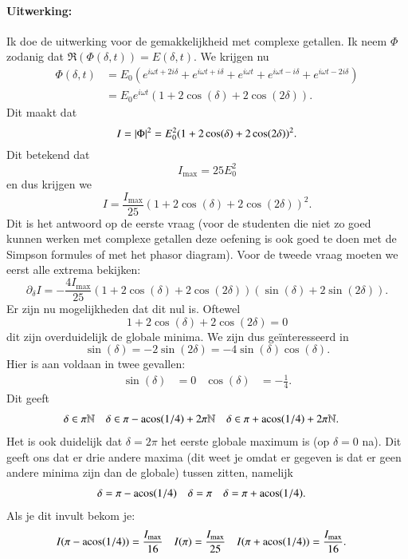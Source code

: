 \documentclass[11pt]{article}
\begin{document}
\paragraph{Uitwerking: }Ik doe de uitwerking voor de gemakkelijkheid met complexe getallen. Ik neem $\Phi$ zodanig dat $\Re(\Phi(\delta,t))=E(\delta,t)$. We krijgen nu
\begin{align}
	\Phi(\delta,t)&=E_0(e^{i\omega t+2i\delta}+e^{i\omega t+i\delta}+e^{i\omega t}+e^{i\omega t-i\delta}+e^{i\omega t-2i\delta})\\
	&=E_0 e^{i\omega t}(1+2\cos(\delta)+2\cos(2\delta)).
\end{align}
Dit maakt dat
\begin{equation}
	I=\abs{\Phi}^2=E_0^2(1+2\cos(\delta)+2\cos(2\delta))^2.
\end{equation}
Dit betekend dat
\begin{equation}
	I_{\text{max}}=25 E_0^2
\end{equation}
en dus krijgen we
\begin{equation}
	I=\frac{I_{\text{max}}}{25}(1+2\cos(\delta)+2\cos(2\delta))^2.
\end{equation}
Dit is het antwoord op de eerste vraag (voor de studenten die niet zo goed kunnen werken met complexe getallen deze oefening is ook goed te doen met de Simpson formules of met het phasor diagram). Voor de tweede vraag moeten we eerst alle extrema bekijken:
\begin{equation}
	\partial_\delta I = - \frac{4I_\text{max}}{25} (1+2\cos(\delta)+2\cos(2\delta))(\sin(\delta)+2\sin(2\delta)).
\end{equation}
Er zijn nu mogelijkheden dat dit nul is. Oftewel
\begin{equation}
	1+2\cos(\delta)+2\cos(2\delta)=0
\end{equation}
dit zijn overduidelijk de globale minima. We zijn dus geïnteresseerd in
\begin{equation}
	\sin(\delta)=-2\sin(2\delta)=-4\sin(\delta)\cos(\delta).
\end{equation}
Hier is aan voldaan in twee gevallen:
\begin{align}
	\sin(\delta)&=0&\cos(\delta)&=-\frac{1}{4}.
\end{align}
Dit geeft
\begin{align}
	\delta&\in \pi\mathbb{N}&\delta&\in\pi-\acos(1/4)+2\pi \mathbb{N}&\delta&\in\pi+\acos(1/4)+2\pi \mathbb{N}.
\end{align}
Het is ook duidelijk dat $\delta=2\pi$ het eerste globale maximum is (op $\delta=0$ na). Dit geeft ons dat er drie andere maxima (dit weet je omdat er gegeven is dat er geen andere minima zijn dan de globale) tussen zitten, namelijk
\begin{align}
	\delta&=\pi-\acos(1/4)&\delta&=\pi&\delta&=\pi+\acos(1/4).
\end{align}
Als je dit invult bekom je:
\begin{align}
	I(\pi-\acos(1/4))&=\frac{I_{\text{max}}}{16}&I(\pi)&=\frac{I_{\text{max}}}{25}&I(\pi+\acos(1/4))&=\frac{I_{\text{max}}}{16}.
\end{align}
\end{document}
